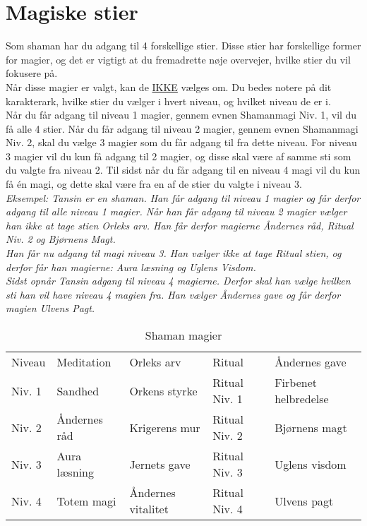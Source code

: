 \section*{Magiske stier}
Som shaman har du adgang til 4 forskellige stier. Disse stier har forskellige former for magier, og det er vigtigt at du fremadrette nøje overvejer, hvilke stier du vil fokusere på.\\
Når disse magier er valgt, kan de \underline{IKKE} vælges om. Du bedes notere på dit karakterark, hvilke stier du vælger i hvert niveau, og hvilket niveau de er i.\\
Når du får adgang til niveau 1 magier, gennem evnen Shamanmagi Niv. 1, vil du få alle 4 stier. Når du får adgang til niveau 2 magier, gennem evnen Shamanmagi Niv. 2, skal du vælge 3 magier som du får adgang til fra dette niveau. For niveau 3 magier vil du kun få adgang til 2 magier, og disse skal være af samme sti som du valgte fra niveau 2. Til sidst når du får adgang til en niveau 4 magi vil du kun få én magi, og dette skal være fra en af de stier du valgte i niveau 3. \\
\textit{Eksempel: Tansin er en shaman. Han får adgang til niveau 1 magier og får derfor adgang til alle niveau 1 magier. Når han får adgang til niveau 2 magier vælger han ikke at tage stien Orleks arv. Han får derfor magierne Åndernes råd, Ritual Niv. 2 og Bjørnens Magt.\\
Han får nu adgang til magi niveau 3. Han vælger ikke at tage Ritual stien, og derfor får han magierne: Aura læsning og Uglens Visdom.\\
Sidst opnår Tansin adgang til niveau 4 magierne. Derfor skal han vælge hvilken sti han vil have niveau 4 magien fra. Han vælger Åndernes gave og får derfor magien Ulvens Pagt.\\}

\newpage
\begin{table}[H]
    \centering
    \begin{tabular}{|p{}|p{}|p{}|p{}|p{}|}
    \hline
    \rowcolor{cerulean!80}
    \multicolumn{5}{c}{Shaman magi}\\
    \hline
    \rowcolor{cerulean!40}
         Niveau & Meditation & Orleks arv & Ritual & Åndernes gave \\\hline
         
        Niv. 1 & Sandhed & Orkens styrke & Ritual Niv. 1 & Firbenet helbredelse\\\hline

        Niv. 2 & Åndernes råd & Krigerens mur & Ritual Niv. 2 & Bjørnens magt\\\hline
    
         Niv. 3 & Aura læsning & Jernets gave & Ritual Niv. 3 & Uglens visdom\\\hline
         Niv. 4 & Totem magi & Åndernes vitalitet & Ritual Niv. 4 & Ulvens pagt\\\hline
         \end{tabular}
         \caption{Shaman magier}
\end{table}
\newpage

